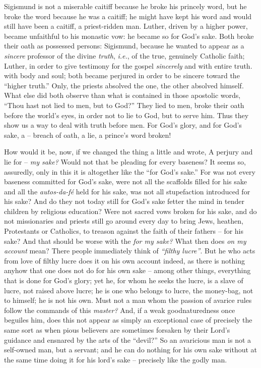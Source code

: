 \documentclass[12pt,a4paper]{book}
\begin{document}
Sigismund is not a miserable caitiff because he broke his princely word, but 
he broke the word because he was a caitiff; he might have kept his word and 
would still have been a caitiff, a priest-ridden man. Luther, driven by a 
higher power, became unfaithful to his monastic vow: he became so for God's 
sake. Both broke their oath as possessed persons: Sigismund, because he wanted 
to appear as a \textit{sincere} professor of the divine \textit{truth}, 
\textit{i.e.}, of the true, genuinely Catholic faith; Luther, in order to 
give testimony for the gospel \textit{sincerely} and with entire truth. with 
body and soul; both became perjured in order to be sincere toward the 
``higher truth.'' Only, the priests absolved the one, the other absolved 
himself. What else did both observe than what is contained in those apostolic 
words, ``Thou hast not lied to men, but to God?'' They lied to men, broke 
their oath before the world's eyes, in order not to lie to God, but to serve 
him. Thus they show us a way to deal with truth before men. For God's glory, 
and for God's sake, a -- breach of oath, a lie, a prince's word broken!

How would it be, now, if we changed the thing a little and wrote, A perjury 
and lie for -- \textit{my sake?} Would not that be pleading for every 
baseness? It seems so, assuredly, only in this it is altogether like the 
``for God's sake.'' For was not every baseness committed for God's sake, 
were not all the scaffolds filled for his sake and all the 
\textit{autos-da-f\'e} held for his sake, was not all stupefaction introduced 
for his sake? And do they not today still for God's sake fetter the mind in 
tender children by religious education? Were not sacred vows broken for his 
sake, and do not missionaries and priests still go around every day to bring 
Jews, heathen, Protestants or Catholics, to treason against the faith of their 
fathers -- for his sake? And that should be worse with the \textit{for my 
sake?} What then does \textit{on my account} mean? There people immediately 
think of \textit{``filthy lucre''}. But he who acts from love of filthy 
lucre does it on his own account indeed, as there is nothing anyhow that one 
does not do for his own sake -- among other things, everything that is done 
for God's glory; yet he, for whom he seeks the lucre, is a slave of lucre, not 
raised above lucre; he is one who belongs to lucre, the money-bag, not to 
himself; he is not his own. Must not a man whom the passion of avarice rules 
follow the commands of this \textit{master?} And, if a weak goodnaturedness 
once beguiles him, does this not appear as simply an exceptional case of 
precisely the same sort as when pious believers are sometimes forsaken by 
their Lord's guidance and ensnared by the arts of the ``devil?'' So an 
avaricious man is not a self-owned man, but a servant; and he can do nothing 
for his own sake without at the same time doing it for his lord's sake -- 
precisely like the godly man.
\end{document}
